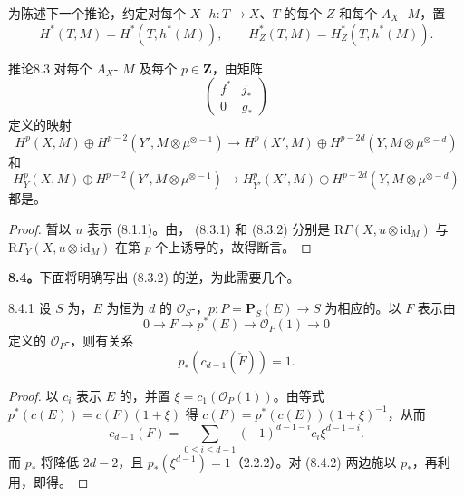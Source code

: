 为陈述下一个推论，约定对每个 $X$- $h:T\to X$、$T$ 的每个 $Z$ 和每个 $A_X$- $M$，置
\[
 H^*(T,M)=H^*(T,h^*(M)),\qquad H_Z^*(T,M)=H_Z^*(T,h^*(M)).
\]
\begin{SGAresult}{推论}{8.3}
对每个 $A_X$- $M$ 及每个 $p\in\mathbf Z$，由矩阵
\[
\begin{pmatrix}f^*&j_*\\0&g_*\end{pmatrix}
\]
定义的映射
\[
 H^p(X,M)\oplus H^{p-2}(Y',M\otimes\mu^{\otimes-1})
 \longrightarrow H^p(X',M)\oplus H^{p-2d}(Y,M\otimes\mu^{\otimes-d})
 \tag{8.3.1}
\]
和
\[
 H_Y^p(X,M)\oplus H^{p-2}(Y',M\otimes\mu^{\otimes-1})
 \longrightarrow H_{Y'}^p(X',M)\oplus H^{p-2d}(Y,M\otimes\mu^{\otimes-d})
 \tag{8.3.2}
\]
都是。
\end{SGAresult}
\begin{proof}
暂以 $u$ 表示 (8.1.1)。由， (8.3.1) 和 (8.3.2) 分别是 $\mathrm R\Gamma(X,u\otimes\mathrm{id}_M)$ 与 $\mathrm R\Gamma_Y(X,u\otimes\mathrm{id}_M)$ 在第 $p$ 个上诱导的，故得断言。
\end{proof}
\textbf{8.4。}下面将明确写出 (8.3.2) 的逆，为此需要几个。
\begin{SGAresult}{}{8.4.1}
设 $S$ 为，$E$ 为恒为 $d$ 的 $\mathscr O_S$-，$p:P=\mathbf P_S(E)\to S$ 为相应的。以 $F$ 表示由
\[
0\longrightarrow F\longrightarrow p^*(E)\longrightarrow\mathscr O_P(1)\longrightarrow0
\]
定义的 $\mathscr O_P$-，则有关系
\[
 p_*(c_{d-1}(\check F))=1.
\]
\end{SGAresult}
\begin{proof}
以 $c_i$ 表示 $E$ 的，并置 $\xi=c_1(\mathscr O_P(1))$。由等式 $p^*(c(E))=c(F)(1+\xi)$ 得 $c(F)=p^*(c(E))(1+\xi)^{-1}$，从而
\[
 c_{d-1}(F)=\sum_{0\le i\le d-1}(-1)^{d-1-i}c_i\xi^{d-1-i}.
 \tag{8.4.2}
\]
而 $p_*$ 将降低 $2d-2$，且 $p_*(\xi^{d-1})=1$（2.2.2）。对 (8.4.2) 两边施以 $p_*$，再利用，即得。
\end{proof}
